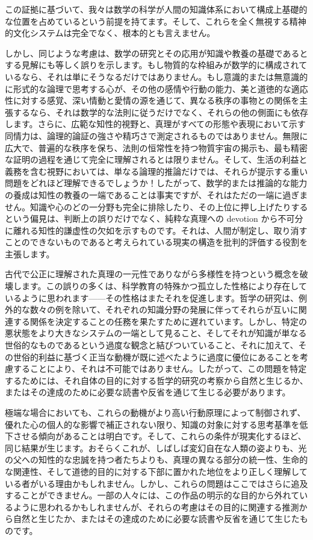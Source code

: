 \documentclass[a4paper,11pt,openany]{ltjsbook}
\begin{document}
この証拠に基づいて、我々は数学の科学が人間の知識体系において構成上基礎的な位置を占めているという前提を持てます。そして、これらを全く無視する精神的文化システムは完全でなく、根本的とも言えません。

しかし、同じような考慮は、数学の研究とその応用が知識や教養の基礎であるとする見解にも等しく誤りを示します。もし物質的な枠組みが数学的に構成されているなら、それは単にそうなるだけではありません。もし意識的または無意識的に形式的な論理で思考する心が、その他の感情や行動の能力、美と道徳的な適応性に対する感覚、深い情動と愛情の源を通じて、異なる秩序の事物との関係を主張するなら、それは数学的な法則に従うだけでなく、それらの他の側面にも依存します。さらに、広範な知性的視野と、真理がすべての形態や表現において示す同情力は、論理的論証の強さや精巧さで測定されるものではありません。無限に広大で、普遍的な秩序を保ち、法則の恒常性を持つ物質宇宙の揭示も、最も精密な証明の過程を通じて完全に理解されるとは限りません。そして、生活の利益と義務を含む視野においては、単なる論理的推論だけでは、それらが提示する重い問題をどれほど理解できるでしょうか！したがって、数学的または推論的な能力の養成は知性の教養の一端であることは事実ですが、それはただの一端に過ぎません。知識や心のどの一分野も完全に排除したり、その上位に押し上げたりするという偏見は、判断上の誤りだけでなく、純粋な真理への devotion から不可分に離れる知性的謙虚性の欠如を示すものです。それは、人間が制定し、取り消すことのできないものであると考えられている現実の構造を批判的評価する役割を主張します。

古代で公正に理解された真理の一元性でありながら多様性を持つという概念を破壊します。この誤りの多くは、科学教育の特殊かつ孤立した性格により存在しているように思われます——その性格はまたそれを促進します。哲学の研究は、例外的な数々の例を除いて、それぞれの知識分野の発展に伴ってそれらが互いに関連する関係を決定することの任務を果たすために遅れています。しかし、特定の悪状態をより大きなシステムの一端として見ること、そしてそれが知識が単なる世俗的なものであるという過度な観念と結びついていること、それに加えて、その世俗的利益に基づく正当な動機が既に述べたように過度に優位にあることを考慮することにより、それは不可能ではありません。したがって、この問題を特定するためには、それ自体の目的に対する哲学的研究の考察から自然と生じるか、またはその達成のために必要な読書や反省を通じて生じる必要があります。

極端な場合においても、これらの動機がより高い行動原理によって制御されず、優れた心の個人的な影響で補正されない限り、知識の対象に対する思考基準を低下させる傾向があることは明白です。そして、これらの条件が現実化するほど、同じ結果が生じます。おそらくこれが、しばしば変幻自在な人類の姿よりも、光の父への知性的な忠誠を持つ者たちよりも、真理の異なる部分の統一性、生命的な関連性、そして道徳的目的に対する下部に置かれた地位をより正しく理解している者がいる理由かもしれません。しかし、これらの問題はここではさらに追及することができません。一部の人々には、この作品の明示的な目的から外れているように思われるかもしれませんが、それらの考慮はその目的に関連する推測から自然と生じたか、またはその達成のために必要な読書や反省を通じて生じたものです。
\end{document}
